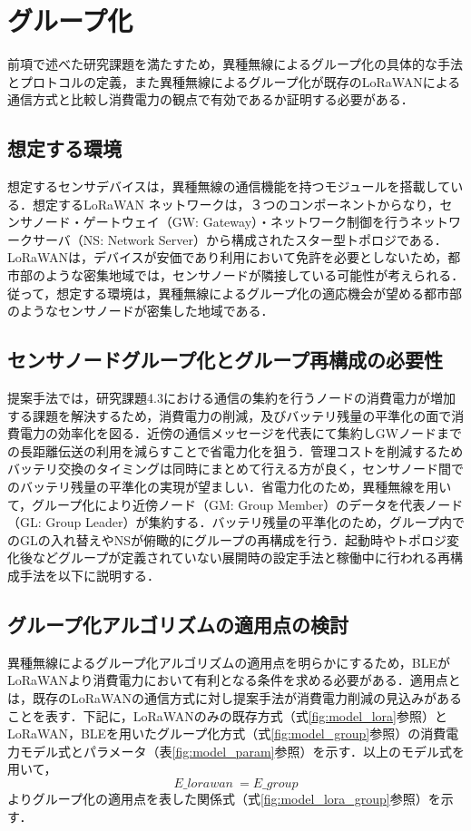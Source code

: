 \section{グループ化}
前項で述べた研究課題を満たすため，異種無線によるグループ化の具体的な手法とプロトコルの定義，また異種無線によるグループ化が既存のLoRaWANによる通信方式と比較し消費電力の観点で有効であるか証明する必要がある．

\subsection{想定する環境}
想定するセンサデバイスは，異種無線の通信機能を持つモジュールを搭載している．想定するLoRaWAN ネットワークは，３つのコンポーネントからなり，センサノード・ゲートウェイ（GW: Gateway）・ネットワーク制御を行うネットワークサーバ（NS: Network Server）から構成されたスター型トポロジである．LoRaWANは，デバイスが安価であり利用において免許を必要としないため，都市部のような密集地域では，センサノードが隣接している可能性が考えられる．従って，想定する環境は，異種無線によるグループ化の適応機会が望める都市部のようなセンサノードが密集した地域である．

\subsection{センサノードグループ化とグループ再構成の必要性}
提案手法では，研究課題4.3における通信の集約を行うノードの消費電力が増加する課題を解決するため，消費電力の削減，及びバッテリ残量の平準化の面で消費電力の効率化を図る．近傍の通信メッセージを代表にて集約しGWノードまでの長距離伝送の利用を減らすことで省電力化を狙う．管理コストを削減するためバッテリ交換のタイミングは同時にまとめて行える方が良く，センサノード間でのバッテリ残量の平準化の実現が望ましい．省電力化のため，異種無線を用いて，グループ化により近傍ノード（GM: Group Member）のデータを代表ノード（GL: Group Leader）が集約する．バッテリ残量の平準化のため，グループ内でのGLの入れ替えやNSが俯瞰的にグループの再構成を行う．起動時やトポロジ変化後などグループが定義されていない展開時の設定手法と稼働中に行われる再構成手法を以下に説明する．

\subsection{グループ化アルゴリズムの適用点の検討}
異種無線によるグループ化アルゴリズムの適用点を明らかにするため，BLEがLoRaWANより消費電力において有利となる条件を求める必要がある．適用点とは，既存のLoRaWANの通信方式に対し提案手法が消費電力削減の見込みがあることを表す．下記に，LoRaWANのみの既存方式（式\ref{fig:model_lora}参照）とLoRaWAN，BLEを用いたグループ化方式（式\ref{fig:model_group}参照）の消費電力モデル式とパラメータ（表\ref{fig:model_param}参照）を示す．以上のモデル式を用いて，$$ E\_{lorawan} \>= E\_{group} $$ よりグループ化の適用点を表した関係式（式\ref{fig:model_lora_group}参照）を示す．

